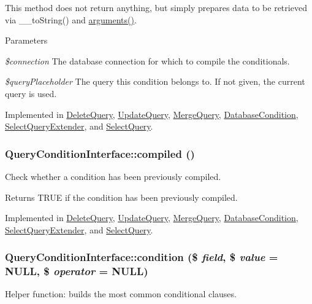 This method does not return anything, but simply prepares data to be retrieved via \_\-\_\-toString() and \hyperlink{interfaceQueryConditionInterface_ac2349e02d5332412182cf472ba1a1b1e}{arguments()}.


\begin{DoxyParams}{Parameters}
\item[{\em \$connection}]The database connection for which to compile the conditionals. \item[{\em \$queryPlaceholder}]The query this condition belongs to. If not given, the current query is used. \end{DoxyParams}


Implemented in \hyperlink{classDeleteQuery_a62db6fe45f790c20479b6844ba58ac83}{DeleteQuery}, \hyperlink{classUpdateQuery_aea38d2404c542788180cd7fc8867f39d}{UpdateQuery}, \hyperlink{classMergeQuery_a33436167b6e2ddc710b2a51db146ea67}{MergeQuery}, \hyperlink{classDatabaseCondition_a286df1af0dfaa7ab6b8b30ed4e96a830}{DatabaseCondition}, \hyperlink{classSelectQueryExtender_af0ccde59737751f63dfb1743798a45ab}{SelectQueryExtender}, and \hyperlink{classSelectQuery_ad858d64a89ca6b8d60f135470d40319f}{SelectQuery}.\hypertarget{interfaceQueryConditionInterface_a4aac3f4505275edecad9c22351e591cb}{
\subsubsection[{compiled}]{\setlength{\rightskip}{0pt plus 5cm}QueryConditionInterface::compiled ()}}
\label{interfaceQueryConditionInterface_a4aac3f4505275edecad9c22351e591cb}
Check whether a condition has been previously compiled.

\begin{DoxyReturn}{Returns}
TRUE if the condition has been previously compiled. 
\end{DoxyReturn}


Implemented in \hyperlink{classDeleteQuery_a5f30ca2a90863366b492bc1a3b09ae24}{DeleteQuery}, \hyperlink{classUpdateQuery_aa094828d0014df9d6893ddc61ea00852}{UpdateQuery}, \hyperlink{classMergeQuery_ab6c0c905db976734e61d6ef997bd3a6a}{MergeQuery}, \hyperlink{classDatabaseCondition_ac084ec53fb54ca89446acffda50b2e6a}{DatabaseCondition}, \hyperlink{classSelectQueryExtender_ae8449b348179f2717a6f07e14f3c806c}{SelectQueryExtender}, and \hyperlink{classSelectQuery_adc1283f0d5b5f20ed7a69bf8bee7e935}{SelectQuery}.\hypertarget{interfaceQueryConditionInterface_aa6d9d96fa17441b5222d1ffddd4c1799}{
\subsubsection[{condition}]{\setlength{\rightskip}{0pt plus 5cm}QueryConditionInterface::condition (\$ {\em field}, \/  \$ {\em value} = {\ttfamily NULL}, \/  \$ {\em operator} = {\ttfamily NULL})}}
\label{interfaceQueryConditionInterface_aa6d9d96fa17441b5222d1ffddd4c1799}
Helper function: builds the most common conditional clauses.

